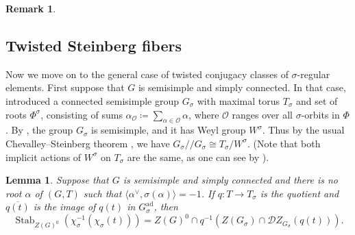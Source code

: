 \documentclass[11pt,reqno]{amsart}
\newtheorem{lemma}[theorem]{Lemma}
\theoremstyle{definition}
\newtheorem{remark}[theorem]{Remark}
\renewcommand{\rm}{\mathrm}
\newcommand{\Spec}{\mathrm{Spec} \,}
\newcommand{\bZ}{{\mathbf Z}}
\newcommand{\cO}{\mathcal{O}}
\newcommand{\sD}{{\mathscr D}}
\DeclareMathOperator{\diag}{diag}
\DeclareMathOperator{\PGL}{PGL}
\DeclareMathOperator{\Stab}{Stab}
\newcommand{\ov}[1]{\overline{#1}}
\begin{document}
\begin{remark}
\end{remark}

\subsection{Twisted Steinberg fibers}

Now we move on to the general case of twisted conjugacy classes of $\sigma$-regular elements. First suppose that $G$ is semisimple and simply connected. In that case, \cite{Springer-twisted} introduced a connected semisimple group $G_\sigma$ with maximal torus $T_\sigma$ and set of roots $\Phi^\sigma$, consisting of sums $\alpha_\cO \coloneqq \sum_{\alpha \in \cO} \alpha$, where $\cO$ ranges over all $\sigma$-orbits in $\Phi$.
By \cite[Proposition 1, Proposition 2]{Springer-twisted}, the group $G_\sigma$ is semisimple, and it has Weyl group $W^\sigma$. Thus by the usual Chevalley--Steinberg theorem \cite[Corollary 6.4]{SteinbergReg}, we have $G_\sigma/\!/G_\sigma \cong T_\sigma/W^\sigma$. (Note that both implicit actions of $W^\sigma$ on $T_\sigma$ are the same, as one can see by \cite[D\'efinition-Th\'eor\`eme 1.15]{DM-non-connexes}).

\begin{lemma}\label{lemma:stabilizer-not-in-type-A}
    Suppose that $G$ is semisimple and simply connected and there is no root $\alpha$ of $(G, T)$ such that $\langle \alpha^\vee, \sigma(\alpha)\rangle = -1$. If $q\colon T \to T_\sigma$ is the quotient and $\ov{q(t)}$ is the image of $q(t)$ in $G_\sigma^{\rm{ad}}$, then
    \[
    \Stab_{Z(G)^0}(\chi_\sigma^{-1}(\chi_\sigma(t))) = Z(G)^0 \cap q^{-1}(Z(G_\sigma) \cap \sD Z_{G_\sigma}(q(t))).
    \]
\end{lemma}
\end{document}
